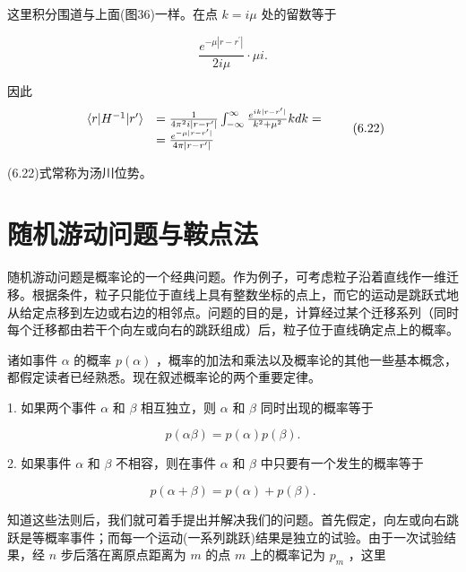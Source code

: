 这里积分围道与上面(图36)一样。在点 $k = i\mu$ 处的留数等于

\begin{equation*}
\frac {e ^ {- \mu | r - r ^ {\prime} |}}{2 i \mu} \cdot \mu i.
\end{equation*}

因此
\begin{equation*}
\begin{array}{r l} \langle r | H ^ {- 1} | r ^ {\prime} \rangle & = \frac {1}{4 \pi^ {2} i | r - r ^ {\prime} |} \int_ {- \infty} ^ {\infty} \frac {e ^ {i k | r - r ^ {\prime} |}}{k ^ {2} + \mu^ {2}} k d k = \\ & = \frac {e ^ {- \mu | r - r ^ {\prime} |}}{4 \pi | r - r ^ {\prime} |} \end{array}\tag{6.22}
\end{equation*}

(6.22)式常称为汤川位势。

\section{随机游动问题与鞍点法}

随机游动问题是概率论的一个经典问题。作为例子，可考虑粒子沿着直线作一维迁移。根据条件，粒子只能位于直线上具有整数坐标的点上，而它的运动是跳跃式地从给定点移到左边或右边的相邻点。问题的目的是，计算经过某个迁移系列（同时每个迁移都由若干个向左或向右的跳跃组成）后，粒子位于直线确定点上的概率。

诸如事件 $\alpha$ 的概率 $p(\alpha)$ ，概率的加法和乘法以及概率论的其他一些基本概念，都假定读者已经熟悉。现在叙述概率论的两个重要定律。

1. 如果两个事件 $\alpha$ 和 $\beta$ 相互独立，则 $\alpha$ 和 $\beta$ 同时出现的概率等于

\begin{equation*}
p (\alpha \beta) = p (\alpha) p (\beta).
\end{equation*}

2. 如果事件 $\alpha$ 和 $\beta$ 不相容，则在事件 $\alpha$ 和 $\beta$ 中只要有一个发生的概率等于

\begin{equation*}
p (\alpha + \beta) = p (\alpha) + p (\beta).
\end{equation*}

知道这些法则后，我们就可着手提出并解决我们的问题。首先假定，向左或向右跳跃是等概率事件；而每一个运动(一系列跳跃)结果是独立的试验。由于一次试验结果，经 $n$ 步后落在离原点距离为 $m$ 的点 $m$ 上的概率记为 $p_m$ ，这里


